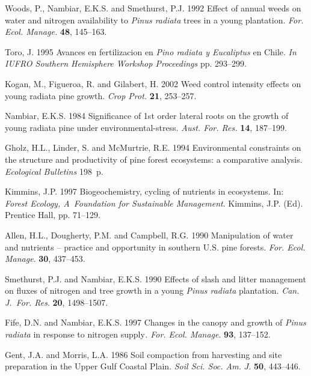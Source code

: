 \documentclass[final]{foresj}
\begin{document}
\begin{thebibliography}
Woods, P., Nambiar, E.K.S. and Smethurst, P.J. 1992 Effect
of annual weeds on water and nitrogen availability to
\textit{Pinus radiata} trees in a young plantation.
\textit{For. Ecol. Manage.} \textbf{48}, 145--163.\vspace*{0.5pt}

Toro, J. 1995 Avances en fertilizacion en \textit{Pino
radiata y Eucaliptus} en Chile. \textit{In IUFRO Southern
Hemisphere Workshop Proceedings} pp. 293--299.\vspace*{0.5pt}

Kogan, M., Figueroa, R. and Gilabert, H. 2002 Weed control
intensity effects on young radiata pine growth.
\textit{Crop Prot.} \textbf{21}, 253--257.\vspace*{0.5pt}

Nambiar, E.K.S. 1984 Significance of 1st order lateral
roots on the growth of young radiata pine under
environmental-stress. \textit{Aust. For. Res.} \textbf{14},
187--199.

Gholz, H.L., Linder, S. and McMurtrie, R.E. 1994
Environmental constraints on the structure and productivity
of pine forest ecosystems: a comparative analysis.
\textit{Ecological Bulletins} 198~p.

Kimmins, J.P. 1997 Biogeochemistry, cycling of nutrients in
ecosystems. In: \textit{Forest Ecology, A~Foundation for
Sustainable Management}. Kimmins, J.P. (Ed). Prentice Hall, pp. 71--129.

Allen, H.L., Dougherty, P.M. and Campbell, R.G. 1990
Manipulation of water and nutrients -- practice and
opportunity in southern U.S. pine forests. \textit{For.
Ecol. Manage}. \textbf{30}, 437--453.

Smethurst, P.J. and Nambiar, E.K.S. 1990 Effects of slash
and litter management on fluxes of nitrogen and tree growth
in a young \textit{Pinus radiata} plantation. \textit{Can.
J.~For. Res}. \textbf{20}, 1498--1507.

Fife, D.N. and Nambiar, E.K.S. 1997 Changes in the canopy
and growth of \textit{Pinus radiata} in response to
nitrogen supply\textit{. For. Ecol. Manage}. \textbf{93},
137--152.

Gent, J.A. and Morris, L.A. 1986 Soil compaction from
harvesting and site preparation in the Upper Gulf Coastal
Plain. \textit{Soil Sci. Soc. Am.} $J$. \textbf{50},
443--446.


\end{thebibliography}
\end{document}
